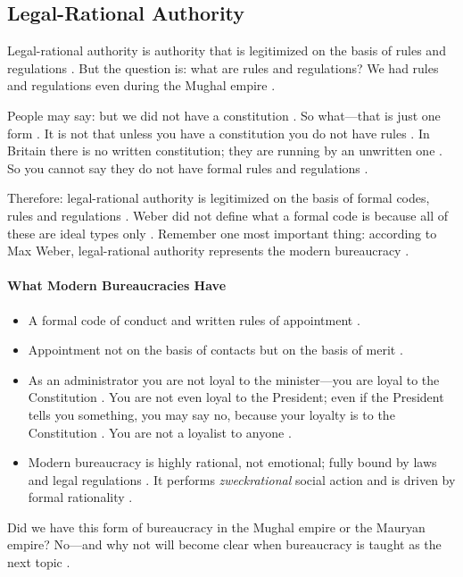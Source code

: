 \subsection{Legal-Rational Authority}
Legal-rational authority is authority that is legitimized on the basis of rules and regulations . But the question is: what are rules and regulations? We had rules and regulations even during the Mughal empire .

\begin{CriticalPoint}
People may say: but we did not have a constitution . So what---that is just one form . It is not that unless you have a constitution you do not have rules .
In Britain there is no written constitution; they are running by an unwritten one . So you cannot say they do not have formal rules and regulations .
\end{CriticalPoint}

Therefore: legal-rational authority is legitimized on the basis of formal codes, rules and regulations . Weber did not define what a formal code is because all of these are ideal types only .
Remember one most important thing: according to Max Weber, legal-rational authority represents the modern bureaucracy .

\paragraph{What Modern Bureaucracies Have}
\begin{itemize}
    \item A formal code of conduct and written rules of appointment .
    \item Appointment not on the basis of contacts but on the basis of merit .
    \item As an administrator you are not loyal to the minister---you are loyal to the Constitution . You are not even loyal to the President; even if the President tells you something, you may say no, because your loyalty is to the Constitution . You are not a loyalist to anyone .
    \item Modern bureaucracy is highly rational, not emotional; fully bound by laws and legal regulations . It performs \textit{zweckrational} social action and is driven by formal rationality .
\end{itemize}

Did we have this form of bureaucracy in the Mughal empire or the Mauryan empire? No---and why not will become clear when bureaucracy is taught as the next topic .

